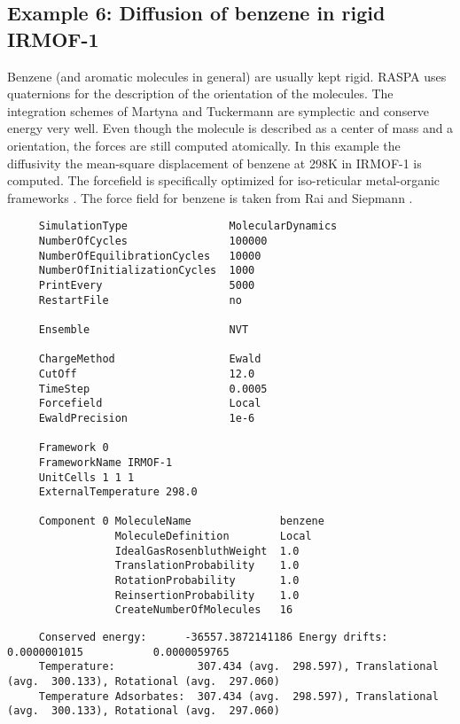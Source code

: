 \subsection*{Example 6: Diffusion of benzene in rigid IRMOF-1}

Benzene (and aromatic molecules in general) are usually kept rigid. RASPA uses quaternions for the description of the
orientation of the molecules. The integration schemes of Martyna and Tuckermann are symplectic and conserve energy
very well. Even though the molecule is described as a center of mass and a orientation, the forces are still computed
atomically. In this example the diffusivity the mean-square displacement of benzene at 298K in IRMOF-1 is computed.
The forcefield is specifically
optimized for iso-reticular metal-organic frameworks \cite{Dubbeldam2007}.
The force field for benzene is taken from Rai and Siepmann \cite{Rai2007}.

\begin{tiny}
\begin{verbatim}
     SimulationType                MolecularDynamics
     NumberOfCycles                100000
     NumberOfEquilibrationCycles   10000
     NumberOfInitializationCycles  1000
     PrintEvery                    5000
     RestartFile                   no

     Ensemble                      NVT

     ChargeMethod                  Ewald
     CutOff                        12.0
     TimeStep                      0.0005
     Forcefield                    Local
     EwaldPrecision                1e-6

     Framework 0
     FrameworkName IRMOF-1
     UnitCells 1 1 1
     ExternalTemperature 298.0

     Component 0 MoleculeName              benzene
                 MoleculeDefinition        Local
                 IdealGasRosenbluthWeight  1.0
                 TranslationProbability    1.0
                 RotationProbability       1.0
                 ReinsertionProbability    1.0
                 CreateNumberOfMolecules   16
\end{verbatim}
\end{tiny}

\begin{tiny}
\begin{verbatim}
     Conserved energy:      -36557.3872141186 Energy drifts:  0.0000001015           0.0000059765
     Temperature:             307.434 (avg.  298.597), Translational (avg.  300.133), Rotational (avg.  297.060)
     Temperature Adsorbates:  307.434 (avg.  298.597), Translational (avg.  300.133), Rotational (avg.  297.060)
\end{verbatim}
\end{tiny}

